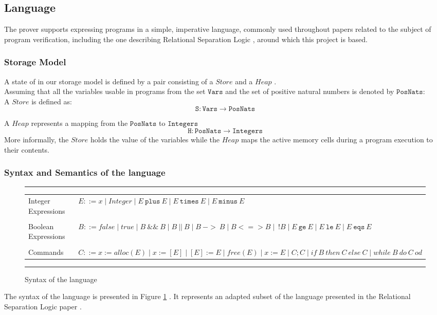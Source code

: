 \documentclass[12pt,a4paper]{article}
\begin{document}
\subsection{Language}
The prover supports expressing programs in a simple, imperative language, commonly used throughout papers \cite{SeparationLogic} \cite{primer} related to the subject of program verification, including the one describing Relational Separation Logic \cite{relational}, around  which this project is based. 
\subsubsection{Storage Model}
A state of in our storage model is defined by a pair consisting of a \(Store\) and a \(Heap\) .
\\
 Assuming that all the variables usable in programs from the set \(\mathtt{Vars}\) and the set of positive natural numbers is denoted by \(\mathtt{PosNats}\): \\
 
A \(Store\) is defined as:
\[ \mathtt{S} : \mathtt{Vars} \rightarrow \mathtt{PosNats} \]
 
A \(Heap\) represents a mapping from the \(\mathtt{PosNats}\) to \(\mathtt{Integers}\)
\[ \mathtt{H} : \mathtt{PosNats} \rightarrow \mathtt{Integers} \] 
More informally, the \(Store\) holds the value of the variables while the \(Heap\) maps the active memory cells during a program execution to their contents.
\subsubsection{Syntax and Semantics of the language}
\begin{figure}[h]
	\noindent\rule{\linewidth}{0.4pt}
	\begin{tabularx}{\linewidth}{l  X}
	Integer Expressions& \(E ::= x \mid Integer \mid E\ \mathtt{plus}\ E \mid E\ \mathtt{times}\ E \mid E\ \mathtt{minus}\ E \) \\
	\\
	Boolean Expressions& \(B ::= false \mid true \mid B\ \mathtt{\&\&}\ B \mid  B\ ||\ B \mid B\  \mathtt{->}\ B \mid B \mathtt{<=>} B \mid \ ! B \mid E\ \mathtt{ge}\ E \mid E\ \mathtt{le}\ E \mid E\ \mathtt{eqs}\ E \)\\
	\\ 	
	Commands& \(C ::= x := alloc(E) \mid x := [E] \mid [E] := E \mid free(E) \mid x := E \mid C;C \mid if\ B\ then\ C\ else\ C \mid while\ B\ do\ C\ od \) \\
	\end{tabularx}
	\caption{Syntax of the language}
	\label{fig:langSyntax}
	\noindent\rule{\linewidth}{0.4pt}
\end{figure}
The syntax of the language is presented in Figure \ref{fig:langSyntax} . It represents an adapted subset of the language presented in the Relational Separation Logic paper \cite{relational} . 
\end{document}
